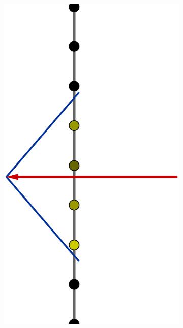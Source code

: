 \documentclass[../Main.tex]{subfiles}
\begin{document}
\begin{figure}[!tbph]
  \centering
  \hspace*{\fill}
  \begin{subfigure}[b]{0.24\textwidth}
    \centering
    \includegraphics[width=\textwidth]{SANTA_1}
  \end{subfigure}\hfill
  \begin{subfigure}[b]{0.24\textwidth}
    \centering

\end{subfigure}
\end{figure}
\end{document}
